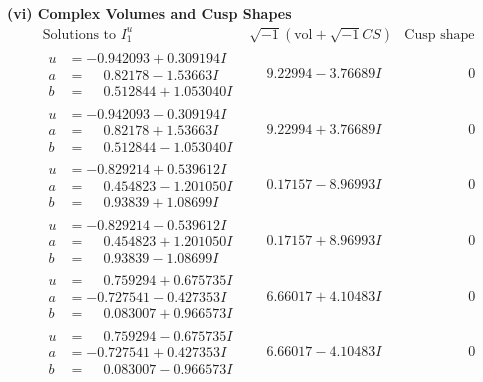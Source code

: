 \documentclass[1p]{elsarticle_modified}
\theoremstyle{definition}
\newcommand{\I}{\sqrt{-1}}
\begin{document}
\newpage\flushleft \textbf{(vi) Complex Volumes and Cusp Shapes}
$$\begin{array}{c|c|c}  
\text{Solutions to }I^u_{1}& \I (\text{vol} + \sqrt{-1}CS) & \text{Cusp shape}\\
 \hline 
\begin{aligned}
u &= -0.942093 + 0.309194 I \\
a &= \phantom{-}0.82178 - 1.53663 I \\
b &= \phantom{-}0.512844 + 1.053040 I\end{aligned}
 & \phantom{-}9.22994 - 3.76689 I & \phantom{-0.000000 } 0 \\ \hline\begin{aligned}
u &= -0.942093 - 0.309194 I \\
a &= \phantom{-}0.82178 + 1.53663 I \\
b &= \phantom{-}0.512844 - 1.053040 I\end{aligned}
 & \phantom{-}9.22994 + 3.76689 I & \phantom{-0.000000 } 0 \\ \hline\begin{aligned}
u &= -0.829214 + 0.539612 I \\
a &= \phantom{-}0.454823 - 1.201050 I \\
b &= \phantom{-}0.93839 + 1.08699 I\end{aligned}
 & \phantom{-}0.17157 - 8.96993 I & \phantom{-0.000000 } 0 \\ \hline\begin{aligned}
u &= -0.829214 - 0.539612 I \\
a &= \phantom{-}0.454823 + 1.201050 I \\
b &= \phantom{-}0.93839 - 1.08699 I\end{aligned}
 & \phantom{-}0.17157 + 8.96993 I & \phantom{-0.000000 } 0 \\ \hline\begin{aligned}
u &= \phantom{-}0.759294 + 0.675735 I \\
a &= -0.727541 - 0.427353 I \\
b &= \phantom{-}0.083007 + 0.966573 I\end{aligned}
 & \phantom{-}6.66017 + 4.10483 I & \phantom{-0.000000 } 0 \\ \hline\begin{aligned}
u &= \phantom{-}0.759294 - 0.675735 I \\
a &= -0.727541 + 0.427353 I \\
b &= \phantom{-}0.083007 - 0.966573 I\end{aligned}
 & \phantom{-}6.66017 - 4.10483 I & \phantom{-0.000000 } 0 \\ \hline\begin{aligned}

\end{aligned}
\end{array}$$
\end{document}

